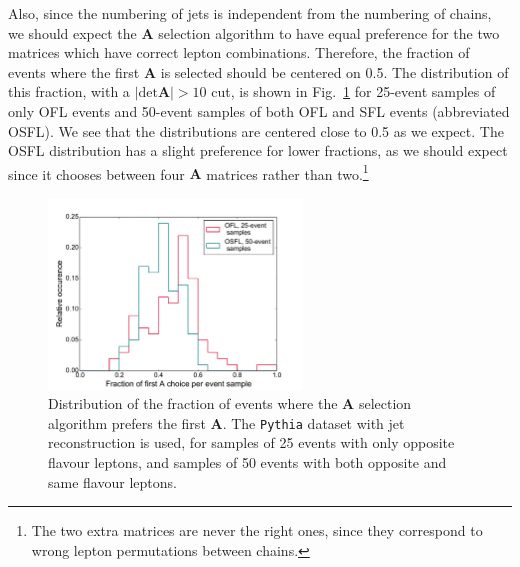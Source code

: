 \documentclass[twoside,english]{uiofysmaster}
\begin{document}
Also, since the numbering of jets is independent from the numbering of chains, we should expect the $\mathbf{A}$ selection algorithm to have equal preference for the two matrices which have correct lepton combinations. Therefore, the fraction of events where the first $\mathbf A$ is selected should be centered on 0.5. The distribution of this fraction, with a $|\mathrm{det}\mathbf A|>10$ cut, is shown in Fig.\ \ref{fig:histogram_jetrec_A1preference} for 25-event samples of only OFL events and 50-event samples of both OFL and SFL events (abbreviated OSFL). We see that the distributions are centered close to 0.5 as we expect. The OSFL distribution has a slight preference for lower fractions, as we should expect since it chooses between four $\mathbf A$ matrices rather than two.\footnote{The two extra matrices are never the right ones, since they correspond to wrong lepton permutations between chains.}
\begin{figure}[hbtp!]
	\centering
	\includegraphics[width=0.6\textwidth]{figures/improving_combinatorics/histogram_jetrec_OFL25evbins_and_OSFL50evbins_detAcut10.pdf} 
	\caption{Distribution of the fraction of events where the $\mathbf A$ selection algorithm prefers the first $\mathbf A$. The {\tt Pythia} dataset with jet reconstruction is used, for samples of 25 events with only opposite flavour leptons, and samples of 50 events with both opposite and same flavour leptons.}
	\label{fig:histogram_jetrec_A1preference}
\end{figure}
\end{document}
